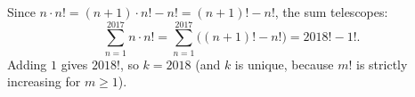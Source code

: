 Since $n\cdot n!=(n+1)\cdot n!-n!=(n+1)!-n!$, the sum telescopes:
\[
\sum_{n=1}^{2017}n\cdot n!=\sum_{n=1}^{2017}\bigl((n+1)!-n!\bigr)=2018!-1! .
\]
Adding $1$ gives $2018!$, so $k=\boxed{2018}$ (and $k$ is unique, because $m!$ is strictly increasing for $m\ge1$).
